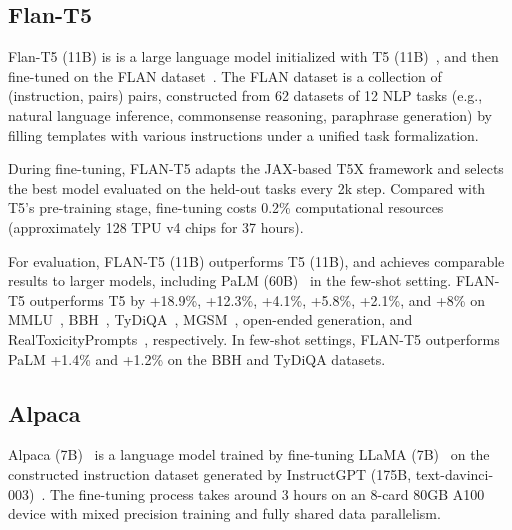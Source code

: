 \documentclass[11pt]{article}
\begin{document}
\subsection{Flan-T5}
 Flan-T5 (11B) is
 is a large language model
  initialized with T5 (11B)~\citep{Raffel2019ExploringTL}, and then  fine-tuned on the FLAN dataset~\citep{longpre2023flan}. The FLAN dataset is a collection of  (instruction, pairs) pairs, 
  constructed from 62 datasets 
   of 12 NLP tasks  (e.g., natural language inference, commonsense reasoning, paraphrase generation)  by filling templates with various instructions under a unified task formalization.  

During fine-tuning, FLAN-T5 adapts the JAX-based T5X framework and selects the best model evaluated on the held-out tasks every 2k step. 
Compared with T5's pre-training stage, fine-tuning costs 0.2\% computational resources  (approximately 128 TPU v4 chips for 37 hours). 

 
For evaluation, FLAN-T5 (11B) outperforms T5 (11B), and achieves comparable results to  larger models, including PaLM (60B)~\citep{Chowdhery2022PaLMSL} in the few-shot setting. FLAN-T5 outperforms T5 by +18.9\%, +12.3\%, +4.1\%, +5.8\%, +2.1\%, and +8\% on  MMLU~\citep{Hendrycks2020MeasuringMM}, BBH~\citep{Suzgun2022ChallengingBT}, TyDiQA~\citep{Clark2020TyDiQA}, MGSM~\citep{Shi2022LanguageMA}, open-ended generation, and RealToxicityPrompts~\citep{Gehman2020RealToxicityPromptsEN}, respectively.  In few-shot settings, FLAN-T5 outperforms PaLM +1.4\% and +1.2\% on the BBH and TyDiQA datasets. 


\subsection{Alpaca}
Alpaca (7B)~\citep{taori2023alpaca} is a language model trained by fine-tuning LLaMA (7B)~\citep{Touvron2023LLaMAOA} on the constructed instruction dataset generated by InstructGPT (175B, text-davinci-003)~\citep{ouyang2022training}. 
The fine-tuning process takes around 3 hours on an 8-card 80GB A100 device with mixed precision training and fully shared data parallelism.
\end{document}
